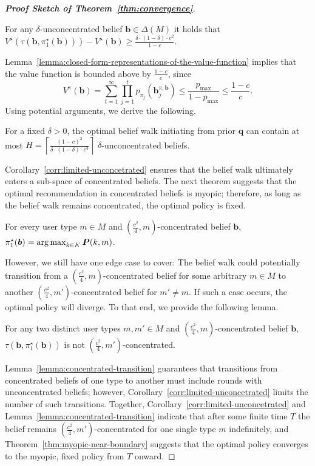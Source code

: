 \begin{proof}[\normalfont\bfseries Proof Sketch of Theorem~\ref{thm:convergence}]
\begin{theorem}\label{thm:gap-between-value-function}
For any $\delta$-unconcentrated belief $\bm{b} \in \Delta(M)$ it holds that $V^{\star}(\tau(\bm{b}, \pi^{\star}_1(\bm{b}))) - V^{\star}(\bm{b}) \geq \frac{\delta \cdot (1 - \delta) \cdot c^2}{1 - c}$.
\end{theorem}
Lemma~\ref{lemma:closed-form-representations-of-the-value-function} implies that the value function is bounded above by $\frac{1-c}{c}$, since
\begin{equation}\label{eq:bounded-value}
V^\pi(\bm{b}) = \sum_{t=1}^{\infty} \prod_{j=1}^{t} p_{\pi_j}(\bm{b}^{\pi, \bm{b}}_j)    \leq \frac{p_{\max}}{1-p_{\max}} \leq \frac{1-c}{c}.
\end{equation}
Using potential arguments, we derive the following.
\begin{corollary}\label{corr:limited-unconcetrated}
For a fixed $\delta > 0$, the optimal belief walk initiating from prior $\bm{q}$ can contain at most $H = \left\lceil\frac{(1 - c)^2}{\delta \cdot (1 - \delta) \cdot c^3}\right\rceil$ $\delta$-unconcentrated beliefs.
\end{corollary}
Corollary~\ref{corr:limited-unconcetrated} ensures that the belief walk ultimately enters a sub-space of concentrated beliefs. The next theorem suggests that the optimal recommendation in concentrated beliefs is myopic; therefore, as long as the belief walk remains concentrated, the optimal policy is fixed.
\begin{theorem}\label{thm:myopic-near-boundary}
For every user type $m \in M$ and $(\frac{c^2}{4}, m)$-concentrated belief $\bm{b}$, $\pi^{\star}_1(\bm{b}) = \operatorname*{arg\,max}_{k \in K} \bm{P}(k, m)$.
\end{theorem}
However, we still have one edge case to cover: The belief walk could potentially transition from a $(\frac{c^2}{4},m)$-concentrated belief for some arbitrary $m \in M$ to another $(\frac{c^2}{4},m')$-concentrated belief for $m' \neq m$. If such a case occurs, the optimal policy will diverge. To that end, we provide the following lemma.
\begin{lemma}\label{lemma:concentrated-transition}
For any two distinct user types $m, m' \in M$ and $(\frac{c^2}{4},m)$-concentrated belief $\bm{b}$, $\tau(\bm b, \pi^\star_1(\bm b))$ is not $(\frac{c^2}{4},m')$-concentrated.
\end{lemma}
Lemma~\ref{lemma:concentrated-transition} guarantees that transitions from concentrated beliefs of one type to another must include rounds with unconcentrated beliefs; however, Corollary~\ref{corr:limited-unconcetrated} limits the number of such transitions. Together, Corollary~\ref{corr:limited-unconcetrated} and Lemma~\ref{lemma:concentrated-transition} indicate that after some finite time $T$ the belief remains $(\frac{c^2}{4},m')$-concentrated for one single type $m$ indefinitely, and Theorem~\ref{thm:myopic-near-boundary} suggests that the optimal policy converges to the myopic, fixed policy from $T$ onward.
\end{proof}